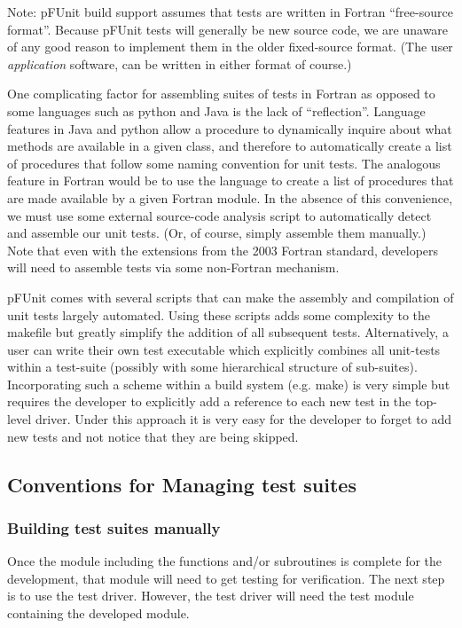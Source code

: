 \documentclass[10pt]{article}
\newcommand{\pfunit}{{\sc pFUnit }}
\begin{document}
Note: \pfunit build support assumes that tests are written in Fortran
``free-source format''.  Because \pfunit tests will generally be new
source code, we are unaware of any good reason to implement them in
the older fixed-source format.  (The user \emph{application} software,
can be written in either format of course.)

One complicating factor for assembling suites of tests in Fortran as
opposed to some languages such as python and Java is the lack of
``reflection''.  Language features in Java and python allow a
procedure to dynamically inquire about what methods are available in a
given class, and therefore to automatically create a list of
procedures that follow some naming convention for unit tests.  The
analogous feature in Fortran would be to use the language to create a
list of procedures that are made available by a given Fortran module.
In the absence of this convenience, we must use some external
source-code analysis script to automatically detect and assemble our
unit tests.  (Or, of course, simply assemble them manually.)  Note
that even with the extensions from the 2003 Fortran standard,
developers will need to assemble tests via some non-Fortran mechanism.

\pfunit comes with several scripts that can make the assembly and
compilation of unit tests largely automated.  Using these scripts adds
some complexity to the makefile but greatly simplify the addition of
all subsequent tests.  Alternatively, a user can write their own test
executable which explicitly combines all unit-tests within a
test-suite (possibly with some hierarchical structure of sub-suites).
Incorporating such a scheme within a build system (e.g. make) is very
simple but requires the developer to explicitly add a reference to
each new test in the top-level driver.  Under this approach it is very
easy for the developer to forget to add new tests and not notice that
they are being skipped.



\subsection{Conventions for Managing test suites}

\subsubsection{Building test suites manually}
Once the module including the functions and/or subroutines is complete
for the development, that module will need to get testing for
verification.  The next step is to use the test driver.  However, the
test driver will need the test module containing the developed module.
\end{document}

